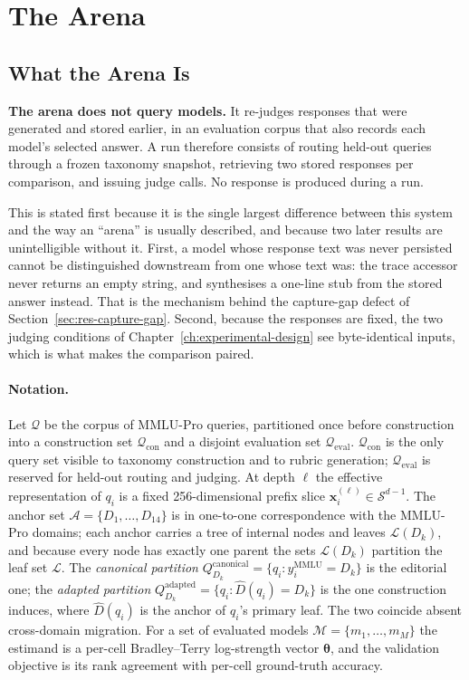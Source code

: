 
\section{The Arena}\label{sec:arch-arena}

\subsection{What the Arena Is}\label{sec:arch-overview}

\textbf{The arena does not query models.} It re-judges responses that
were generated and stored earlier, in an evaluation corpus that also
records each model's selected answer. A run therefore consists of
routing held-out queries through a frozen taxonomy snapshot, retrieving
two stored responses per comparison, and issuing judge calls. No
response is produced during a run.

This is stated first because it is the single largest difference
between this system and the way an ``arena'' is usually described, and
because two later results are unintelligible without it. First, a model
whose response text was never persisted cannot be distinguished
downstream from one whose text was: the trace accessor never returns an
empty string, and synthesises a one-line stub from the stored answer
instead. That is the mechanism behind the capture-gap defect of
Section~\ref{sec:res-capture-gap}. Second, because the responses are
fixed, the two judging conditions of Chapter~\ref{ch:experimental-design}
see byte-identical inputs, which is what makes the comparison paired.

\paragraph{Notation.}
Let $\mathcal{Q}$ be the corpus of MMLU-Pro queries, partitioned once
before construction into a construction set
$\mathcal{Q}_{\text{con}}$ and a disjoint evaluation set
$\mathcal{Q}_{\text{eval}}$.
$\mathcal{Q}_{\text{con}}$ is the only query set visible to taxonomy
construction and to rubric generation; $\mathcal{Q}_{\text{eval}}$ is
reserved for held-out routing and judging.
At depth $\ell$ the effective representation of $q_i$ is a fixed
256-dimensional prefix slice
$\mathbf{x}_i^{(\ell)} \in \mathcal{S}^{d-1}$.
The anchor set $\mathcal{A} = \{D_1, \ldots, D_{14}\}$ is in one-to-one
correspondence with the MMLU-Pro domains; each anchor carries a tree of
internal nodes and leaves $\mathcal{L}(D_k)$, and because every node
has exactly one parent the sets $\mathcal{L}(D_k)$ partition the leaf
set $\mathcal{L}$.
The \textit{canonical partition}
$Q_{D_k}^{\text{canonical}} = \{q_i : y_i^{\text{MMLU}} = D_k\}$ is the
editorial one; the \textit{adapted partition}
$Q_{D_k}^{\text{adapted}} = \{q_i : \hat{D}(q_i) = D_k\}$ is the one
construction induces, where $\hat{D}(q_i)$ is the anchor of $q_i$'s
primary leaf. The two coincide absent cross-domain migration.
For a set of evaluated models $\mathcal{M} = \{m_1, \ldots, m_M\}$ the
estimand is a per-cell Bradley--Terry log-strength vector
$\boldsymbol{\theta}$, and the validation objective is its rank
agreement with per-cell ground-truth accuracy.

